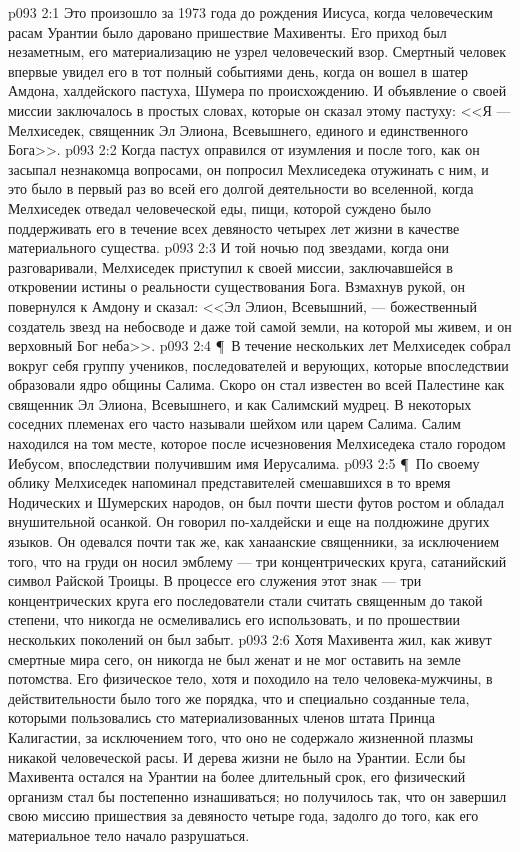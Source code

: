 \vs p093 2:1 Это произошло за 1973 года до рождения Иисуса, когда человеческим расам Урантии было даровано пришествие Махивенты. Его приход был незаметным, его материализацию не узрел человеческий взор. Смертный человек впервые увидел его в тот полный событиями день, когда он вошел в шатер Амдона, халдейского пастуха, Шумера по происхождению. И объявление о своей миссии заключалось в простых словах, которые он сказал этому пастуху: <<Я --- Мелхиседек, священник Эл Элиона, Всевышнего, единого и единственного Бога>>.
\vs p093 2:2 Когда пастух оправился от изумления и после того, как он засыпал незнакомца вопросами, он попросил Мехлиседека отужинать с ним, и это было в первый раз во всей его долгой деятельности во вселенной, когда Мелхиседек отведал человеческой еды, пищи, которой суждено было поддерживать его в течение всех девяносто четырех лет жизни в качестве материального существа.
\vs p093 2:3 И той ночью под звездами, когда они разговаривали, Мелхиседек приступил к своей миссии, заключавшейся в откровении истины о реальности существования Бога. Взмахнув рукой, он повернулся к Амдону и сказал: <<Эл Элион, Всевышний, --- божественный создатель звезд на небосводе и даже той самой земли, на которой мы живем, и он верховный Бог неба>>.
\vs p093 2:4 \P\ В течение нескольких лет Мелхиседек собрал вокруг себя группу учеников, последователей и верующих, которые впоследствии образовали ядро общины Салима. Скоро он стал известен во всей Палестине как священник Эл Элиона, Всевышнего, и как Салимский мудрец. В некоторых соседних племенах его часто называли шейхом или царем Салима. Салим находился на том месте, которое после исчезновения Мелхиседека стало городом Иебусом, впоследствии получившим имя Иерусалима.
\vs p093 2:5 \P\ По своему облику Мелхиседек напоминал представителей смешавшихся в то время Нодических и Шумерских народов, он был почти шести футов ростом и обладал внушительной осанкой. Он говорил по\hyp{}халдейски и еще на полдюжине других языков. Он одевался почти так же, как ханаанские священники, за исключением того, что на груди он носил эмблему --- три концентрических круга, сатанийский символ Райской Троицы. В процессе его служения этот знак --- три концентрических круга его последователи стали считать священным до такой степени, что никогда не осмеливались его использовать, и по прошествии нескольких поколений он был забыт.
\vs p093 2:6 Хотя Махивента жил, как живут смертные мира сего, он никогда не был женат и не мог оставить на земле потомства. Его физическое тело, хотя и походило на тело человека\hyp{}мужчины, в действительности было того же порядка, что и специально созданные тела, которыми пользовались сто материализованных членов штата Принца Калигастии, за исключением того, что оно не содержало жизненной плазмы никакой человеческой расы. И дерева жизни не было на Урантии. Если бы Махивента остался на Урантии на более длительный срок, его физический организм стал бы постепенно изнашиваться; но получилось так, что он завершил свою миссию пришествия за девяносто четыре года, задолго до того, как его материальное тело начало разрушаться.
